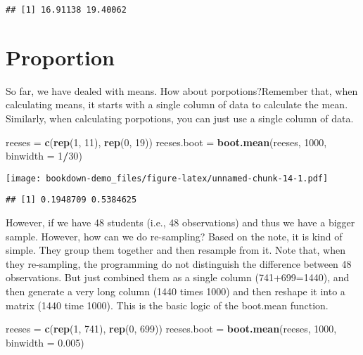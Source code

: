 \documentclass[]{book}
\newenvironment{Shaded}{\begin{snugshade}}{\end{snugshade}}
\newcommand{\DataTypeTok}[1]{\textcolor[rgb]{0.13,0.29,0.53}{#1}}
\newcommand{\DecValTok}[1]{\textcolor[rgb]{0.00,0.00,0.81}{#1}}
\newcommand{\FloatTok}[1]{\textcolor[rgb]{0.00,0.00,0.81}{#1}}
\newcommand{\KeywordTok}[1]{\textcolor[rgb]{0.13,0.29,0.53}{\textbf{#1}}}
\newcommand{\NormalTok}[1]{#1}
\newcommand{\OperatorTok}[1]{\textcolor[rgb]{0.81,0.36,0.00}{\textbf{#1}}}
\newcommand{\StringTok}[1]{\textcolor[rgb]{0.31,0.60,0.02}{#1}}
\begin{document}
\begin{verbatim}
## [1] 16.91138 19.40062
\end{verbatim}

\hypertarget{proportion}{%
\section{Proportion}\label{proportion}}

So far, we have dealed with means. How about porpotions?Remember that, when calculating means, it starts with a single column of data to calculate the mean. Similarly, when calculating porpotions, you can just use a single column of data.

\begin{Shaded}
\begin{Highlighting}[]
\NormalTok{reeses =}\StringTok{ }\KeywordTok{c}\NormalTok{(}\KeywordTok{rep}\NormalTok{(}\DecValTok{1}\NormalTok{, }\DecValTok{11}\NormalTok{), }\KeywordTok{rep}\NormalTok{(}\DecValTok{0}\NormalTok{, }\DecValTok{19}\NormalTok{))}
\NormalTok{reeses.boot =}\StringTok{ }\KeywordTok{boot.mean}\NormalTok{(reeses, }\DecValTok{1000}\NormalTok{, }\DataTypeTok{binwidth =} \DecValTok{1}\OperatorTok{/}\DecValTok{30}\NormalTok{)}
\end{Highlighting}
\end{Shaded}

\texttt{[image: bookdown-demo\_files/figure-latex/unnamed-chunk-14-1.pdf]}

\begin{verbatim}
## [1] 0.1948709 0.5384625
\end{verbatim}

However, if we have 48 students (i.e., 48 observations) and thus we have a bigger sample. However, how can we do re-sampling? Based on the note, it is kind of simple. They group them together and then resample from it. Note that, when they re-sampling, the programming do not distinguish the difference between 48 observations. But just combined them as a single column (741+699=1440), and then generate a very long column (1440 times 1000) and then reshape it into a matrix (1440 time 1000). This is the basic logic of the boot.mean function.

\begin{Shaded}
\begin{Highlighting}[]
\NormalTok{reeses =}\StringTok{ }\KeywordTok{c}\NormalTok{(}\KeywordTok{rep}\NormalTok{(}\DecValTok{1}\NormalTok{, }\DecValTok{741}\NormalTok{), }\KeywordTok{rep}\NormalTok{(}\DecValTok{0}\NormalTok{, }\DecValTok{699}\NormalTok{))}
\NormalTok{reeses.boot =}\StringTok{ }\KeywordTok{boot.mean}\NormalTok{(reeses, }\DecValTok{1000}\NormalTok{, }\DataTypeTok{binwidth =} \FloatTok{0.005}\NormalTok{)}
\end{Highlighting}
\end{Shaded}
\end{document}
